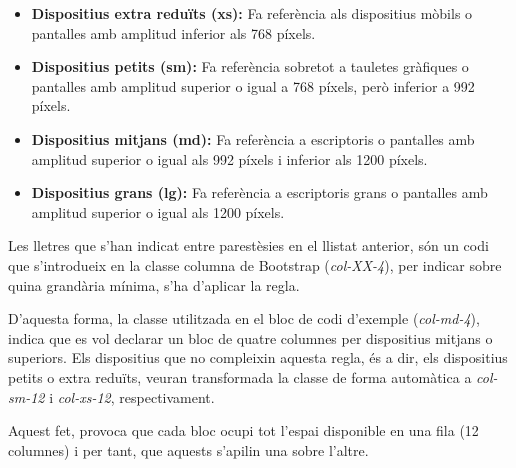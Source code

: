     \begin{itemize}
        \item \textbf{Dispositius extra reduïts (xs):} Fa referència als dispositius mòbils o pantalles amb amplitud inferior als 768 píxels.
        \item \textbf{Dispositius petits (sm):} Fa referència sobretot a tauletes gràfiques o pantalles amb amplitud superior o igual a 768 píxels, però inferior a 992 píxels.
        \item \textbf{Dispositius mitjans (md):} Fa referència a escriptoris o pantalles amb amplitud superior o igual als 992 píxels i inferior als 1200 píxels.
        \item \textbf{Dispositius grans (lg):} Fa referència a escriptoris grans o pantalles amb amplitud superior o igual als 1200 píxels.
    \end{itemize}

    Les lletres que s'han indicat entre parestèsies en el llistat anterior, són un codi que s'introdueix en la classe columna de Bootstrap (\emph{col-XX-4}), per indicar sobre quina grandària mínima, s'ha d'aplicar la regla.

    D'aquesta forma, la classe utilitzada en el bloc de codi d'exemple (\emph{col-md-4}), indica que es vol declarar un bloc de quatre columnes per dispositius mitjans o superiors. Els dispositius que no compleixin aquesta regla, és a dir, els dispositius petits o extra reduïts, veuran transformada la classe de forma automàtica a \emph{col-sm-12} i \emph{col-xs-12}, respectivament.

    Aquest fet, provoca que cada bloc ocupi tot l'espai disponible en una fila (12 columnes) i per tant, que aquests s'apilin una sobre l'altre.
